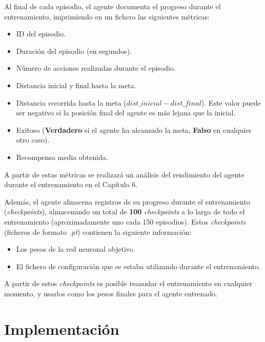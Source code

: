 Al final de cada episodio, el agente documenta el progreso durante el entrenamiento, imprimiendo en un fichero las siguientes métricas:
\begin{itemize}
	\item ID del episodio.
	\item Duración del episodio (en segundos).
	\item Número de acciones realizadas durante el episodio.
	\item Distancia inicial y final hasta la meta.
	\item Distancia recorrida hasta la meta ($dist\_inicial - dist\_final$). Este valor puede ser negativo si la posición final del agente es más lejana que la inicial.
	\item Exitoso (\textbf{Verdadero} si el agente ha alcanzado la meta, \textbf{Falso} en cualquier otro caso).
	\item Recompensa media obtenida.
\end{itemize}

A partir de estas métricas se realizará un análisis del rendimiento del agente durante el entrenamiento en el Capítulo 6.

Además, el agente almacena registros de su progreso durante el entrenamiento (\textit{checkpoints}), almacenando un total de \textbf{100} \textit{checkpoints} a lo largo de todo el entrenamiento (aproximadamente uno cada 150 episodios). Estos \textit{checkpoints} (ficheros de formato \textit{.pt}) contienen la siguiente información:
\begin{itemize}
	\item Los pesos de la red neuronal objetivo.
	\item El fichero de configuración que se estaba utilizando durante el entrenamiento.
\end{itemize}

A partir de estos \textit{checkpoints} es posible reanudar el entrenamiento en cualquier momento, y usarlos como los pesos finales para el agente entrenado.

\section{Implementación}